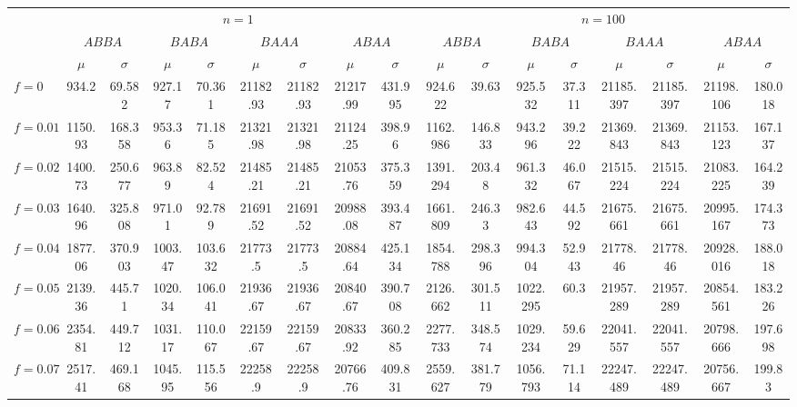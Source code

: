 \begin{tabular}{@{}lcccccccccccccccc@{}}
\toprule
 & \multicolumn{8}{c}{$n=1$} & \multicolumn{8}{c}{$n=100$} \\
\cmidrule(lr){2-9} \cmidrule(lr){10-17}
 & \multicolumn{2}{c}{$ABBA$} & \multicolumn{2}{c}{$BABA$} & \multicolumn{2}{c}{$BAAA$} & \multicolumn{2}{c}{$ABAA$} & \multicolumn{2}{c}{$ABBA$} & \multicolumn{2}{c}{$BABA$} & \multicolumn{2}{c}{$BAAA$} & \multicolumn{2}{c}{$ABAA$} \\
\cmidrule(lr){2-3} \cmidrule(lr){4-5} \cmidrule(lr){6-7} \cmidrule(lr){8-9} \cmidrule(lr){10-11} \cmidrule(lr){12-13} \cmidrule(lr){14-15} \cmidrule(lr){16-17}
 & $\mu$ & $\sigma$ & $\mu$ & $\sigma$ & $\mu$ & $\sigma$ & $\mu$ & $\sigma$ & $\mu$ & $\sigma$ & $\mu$ & $\sigma$ & $\mu$ & $\sigma$ & $\mu$ & $\sigma$ \\
\midrule
$f = 0$ & 934.2 & 69.582 & 927.17 & 70.361 & 21182.93 & 21182.93 & 21217.99 & 431.995 & 924.622 & 39.63 & 925.532 & 37.311 & 21185.397 & 21185.397 & 21198.106 & 180.018 \\
$f = 0.01$ & 1150.93 & 168.358 & 953.36 & 71.185 & 21321.98 & 21321.98 & 21124.25 & 398.96 & 1162.986 & 146.833 & 943.296 & 39.222 & 21369.843 & 21369.843 & 21153.123 & 167.137 \\
$f = 0.02$ & 1400.73 & 250.677 & 963.89 & 82.524 & 21485.21 & 21485.21 & 21053.76 & 375.359 & 1391.294 & 203.48 & 961.332 & 46.067 & 21515.224 & 21515.224 & 21083.225 & 164.239 \\
$f = 0.03$ & 1640.96 & 325.808 & 971.01 & 92.789 & 21691.52 & 21691.52 & 20988.08 & 393.487 & 1661.809 & 246.33 & 982.643 & 44.592 & 21675.661 & 21675.661 & 20995.167 & 174.373 \\
$f = 0.04$ & 1877.06 & 370.903 & 1003.47 & 103.632 & 21773.5 & 21773.5 & 20884.64 & 425.134 & 1854.788 & 298.396 & 994.304 & 52.943 & 21778.46 & 21778.46 & 20928.016 & 188.018 \\
$f = 0.05$ & 2139.36 & 445.71 & 1020.34 & 106.041 & 21936.67 & 21936.67 & 20840.67 & 390.708 & 2126.662 & 301.511 & 1022.295 & 60.3 & 21957.289 & 21957.289 & 20854.561 & 183.226 \\
$f = 0.06$ & 2354.81 & 449.712 & 1031.17 & 110.067 & 22159.67 & 22159.67 & 20833.92 & 360.285 & 2277.733 & 348.574 & 1029.234 & 59.629 & 22041.557 & 22041.557 & 20798.666 & 197.698 \\
$f = 0.07$ & 2517.41 & 469.168 & 1045.95 & 115.556 & 22258.9 & 22258.9 & 20766.76 & 409.831 & 2559.627 & 381.779 & 1056.793 & 71.114 & 22247.489 & 22247.489 & 20756.667 & 199.83 \\

\end{tabular}
